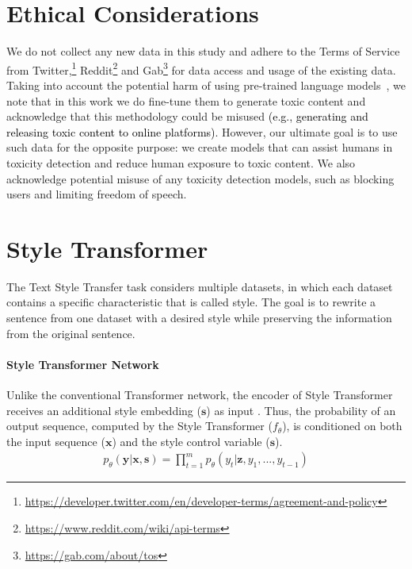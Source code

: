 \documentclass[acmsmall]{acmart}
\newcommand{\red}[1]{\textcolor{black}{#1}}
\begin{document}
\section*{Ethical Considerations}
We do not collect any new data in this study and adhere to the Terms of Service from Twitter,\footnote{\url{https://developer.twitter.com/en/developer-terms/agreement-and-policy}}  Reddit\footnote{\url{https://www.reddit.com/wiki/api-terms}} and Gab\footnote{\url{https://gab.com/about/tos}} for data access and usage of the existing data.
Taking into account the potential harm of using pre-trained language models~\cite{bender}, we note that in this work we do fine-tune them to generate toxic content and acknowledge that this methodology could be misused \red{(e.g., generating and releasing toxic content to online platforms)}. However, our ultimate goal is to use such data for the opposite purpose: we create models that can assist humans in toxicity detection and reduce human exposure to toxic content. We also acknowledge potential misuse of any toxicity detection models, such as blocking users and limiting freedom of speech.  




\appendix

\section{Style Transformer \label{app:styletrans}}
The Text Style Transfer task considers multiple datasets, in which each dataset contains a specific characteristic that is called style. The goal is to rewrite a sentence from one dataset with a desired style while preserving the information from the original sentence.

\paragraph{Style Transformer Network}
Unlike the conventional Transformer network, the encoder of Style Transformer receives an additional style embedding ($\mathbf{s}$) as input \cite{style-transformer}. Thus, the probability of an output sequence, computed by the Style Transformer ($f_{\theta}$), is conditioned on both the input sequence ($\mathbf{x}$) and the style control variable ($\mathbf{s}$).
\begin{gather}
    p_{\theta}(\mathbf{y}|\mathbf{x}, \mathbf{s}) = \prod_{t=1}^{m}p_{\theta}(y_t|\mathbf{z}, y_1, ..., y_{t-1})
\end{gather}
\end{document}
